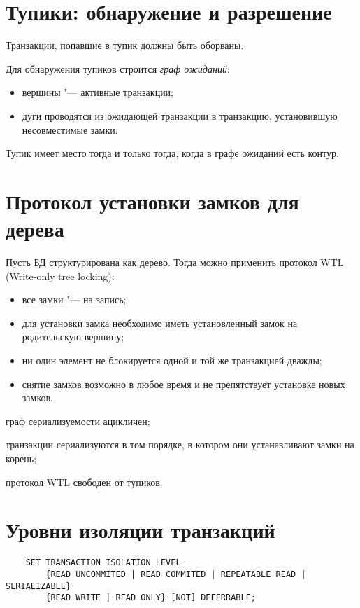 \section{Тупики: обнаружение и разрешение}

Транзакции, попавшие в тупик должны быть оборваны.

Для обнаружения тупиков строится \emph{граф ожиданий}:
\begin{itemize}
	\item вершины "--- активные транзакции;
	\item дуги проводятся из ожидающей транзакции в транзакцию, установившую несовместимые замки.
\end{itemize}

Тупик имеет место тогда и только тогда, когда в графе ожиданий есть контур.

\section{Протокол установки замков для дерева}

Пусть БД структурирована как дерево.
Тогда можно применить протокол WTL (Write-only tree locking):
\begin{itemize}
	\item все замки "--- на запись;
	\item для установки замка необходимо иметь установленный замок на родительскую вершину;
	\item ни один элемент не блокируется одной и той же транзакцией дважды;
	\item снятие замков возможно в любое время и не препятствует установке новых замков.
\end{itemize}

\begin{stmts}
	\item граф сериализуемости ацикличен;
	\item транзакции сериализуются в том порядке, в котором они устанавливают замки на корень;
	\item протокол WTL свободен от тупиков.
\end{stmts}

\section{Уровни изоляции транзакций}

\begin{verbatim}
	SET TRANSACTION ISOLATION LEVEL
		{READ UNCOMMITED | READ COMMITED | REPEATABLE READ | SERIALIZABLE}
		{READ WRITE | READ ONLY} [NOT] DEFERRABLE;
\end{verbatim}


